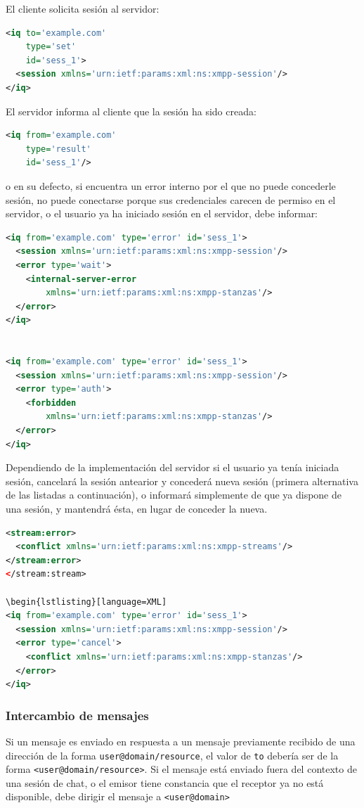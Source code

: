 \documentclass[a4paper, 11pt]{article} %
\begin{document}
    El cliente solicita sesión al servidor:
\begin{lstlisting}[language=XML]
<iq to='example.com'
    type='set'
    id='sess_1'>
  <session xmlns='urn:ietf:params:xml:ns:xmpp-session'/>
</iq>
\end{lstlisting}

    El servidor informa al cliente que la sesión ha sido creada:
\begin{lstlisting}[language=XML]   
<iq from='example.com'
    type='result'
    id='sess_1'/>
\end{lstlisting}

    o en su defecto, si encuentra un error interno por el que no puede concederle sesión, no puede conectarse porque
    sus credenciales carecen de permiso en el servidor, o el usuario ya ha iniciado sesión en el servidor, debe informar:
\begin{lstlisting}[language=XML]
<iq from='example.com' type='error' id='sess_1'>
  <session xmlns='urn:ietf:params:xml:ns:xmpp-session'/>
  <error type='wait'>
    <internal-server-error
        xmlns='urn:ietf:params:xml:ns:xmpp-stanzas'/>
  </error>
</iq>


<iq from='example.com' type='error' id='sess_1'>
  <session xmlns='urn:ietf:params:xml:ns:xmpp-session'/>
  <error type='auth'>
    <forbidden
        xmlns='urn:ietf:params:xml:ns:xmpp-stanzas'/>
  </error>
</iq>
\end{lstlisting}

    Dependiendo de la implementación del servidor si el usuario ya tenía iniciada sesión, cancelará la sesión antearior
    y concederá nueva sesión (primera alternativa de las listadas a continuación), o informará simplemente de que ya
    dispone de una sesión, y mantendrá ésta, en lugar de conceder la nueva.
    
\begin{lstlisting}[language=XML]
<stream:error>
  <conflict xmlns='urn:ietf:params:xml:ns:xmpp-streams'/>
</stream:error>
</stream:stream>

\begin{lstlisting}[language=XML]
<iq from='example.com' type='error' id='sess_1'>
  <session xmlns='urn:ietf:params:xml:ns:xmpp-session'/>
  <error type='cancel'>
    <conflict xmlns='urn:ietf:params:xml:ns:xmpp-stanzas'/>
  </error>
</iq>
\end{lstlisting}

    \subsubsection{Intercambio de mensajes}
      Si un mensaje es enviado en respuesta a un mensaje previamente recibido de una dirección de la forma 
      \texttt{user@domain/resource}, el valor de \texttt{to} debería ser de la forma \texttt{<user@domain/resource>}. Si el
      mensaje está enviado fuera del contexto de una sesión de chat, o el emisor tiene constancia que el receptor ya no
      está disponible, debe dirigir el mensaje a \texttt{<user@domain>}
      
\end{document}
